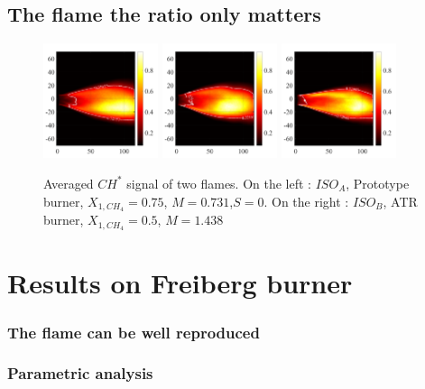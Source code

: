 \subsection{The flame the ratio only matters}

 \begin{figure}[!h]
  \centering
\includegraphics[width=0.3\textwidth]{fig/puissance/DSC_3683puissance.png}
\includegraphics[width=0.3\textwidth]{fig/puissance/DSC_3689puissance.png}
\includegraphics[width=0.3\textwidth]{fig/puissance/DSC_3694puissance.png}
  \caption{Averaged $CH^*$ signal of two flames. On the left : $ISO_{A}$, Prototype burner, $X_{1,CH_{4}}=0.75$, $M =0.731$,$S=0$. On the right : $ISO_{B}$, ATR burner, $X_{1,CH_{4}}=0.5$, $M = 1.438$}
 \label{fig_ISO_brute}
\end{figure}



\section{Results on Freiberg burner}
\subsubsection{The flame can be well reproduced}
\subsubsection{Parametric analysis}

